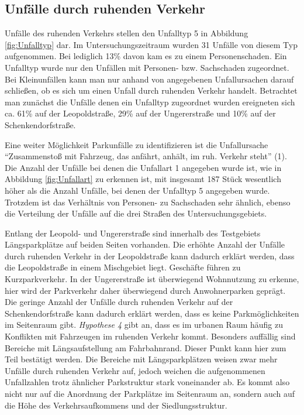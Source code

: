 \subsection{Unfälle durch ruhenden Verkehr}
Unfälle des ruhenden Verkehrs stellen den Unfalltyp 5 in Abbildung \ref{fig:Unfalltyp} dar. Im Untersuchungszeitraum wurden 31 Unfälle von diesem Typ aufgenommen. Bei lediglich 13\% davon kam es zu einem Personenschaden. Ein Unfalltyp wurde nur den Unfällen mit Personen- bzw. Sachschaden zugeordnet. Bei Kleinunfällen kann man nur anhand von angegebenen Unfallursachen darauf schließen, ob es sich um einen Unfall durch ruhenden Verkehr handelt. Betrachtet man zunächst die Unfälle denen ein Unfalltyp zugeordnet wurden ereigneten sich ca. 61\% auf der Leopoldstraße, 29\% auf der Ungererstraße und 10\% auf der Schenkendorfstraße. 

Eine weiter Möglichkeit Parkunfälle zu identifizieren ist die Unfallursache \enquote{Zusammenstoß mit Fahrzeug, das anfährt, anhält, im ruh. Verkehr steht} (1). Die Anzahl der Unfälle bei denen die Unfallart 1 angegeben wurde ist, wie in Abbildung \ref{fig:Unfallart} zu erkennen ist, mit insgesamt 187 Stück wesentlich höher als die Anzahl Unfälle, bei denen der Unfalltyp 5 angegeben wurde. Trotzdem ist das Verhältnis von Personen- zu Sachschaden sehr ähnlich, ebenso die Verteilung der Unfälle auf die drei Straßen des Untersuchungsgebiets. 

Entlang der Leopold- und Ungererstraße sind innerhalb des Testgebiets Längsparkplätze auf beiden Seiten vorhanden. Die erhöhte Anzahl der Unfälle durch ruhenden Verkehr in der Leopoldstraße kann dadurch erklärt werden, dass die Leopoldstraße in einem Mischgebiet liegt. Geschäfte führen zu Kurzparkverkehr. In der Ungererstraße ist überwiegend Wohnnutzung zu erkenne, hier wird der Parkverkehr daher überwiegend durch Anwohnerparken geprägt. Die geringe Anzahl der Unfälle durch ruhenden Verkehr auf der Schenkendorfstraße kann dadurch erklärt werden, dass es keine Parkmöglichkeiten im Seitenraum gibt. \textit{Hypothese 4} gibt an, dass es im urbanen Raum häufig zu Konflikten mit Fahrzeugen im ruhenden Verkehr kommt. Besonders auffällig sind Bereiche mit Längsaufstellung am Fahrbahnrand. Dieser Punkt kann hier zum Teil bestätigt werden. Die Bereiche mit Längsparkplätzen weisen zwar mehr Unfälle durch ruhenden Verkehr auf, jedoch weichen die aufgenommenen Unfallzahlen trotz ähnlicher Parkstruktur stark voneinander ab. Es kommt also nicht nur auf die Anordnung der Parkplätze im Seitenraum an, sondern auch auf die Höhe des Verkehrsaufkommens und der Siedlungsstruktur.

